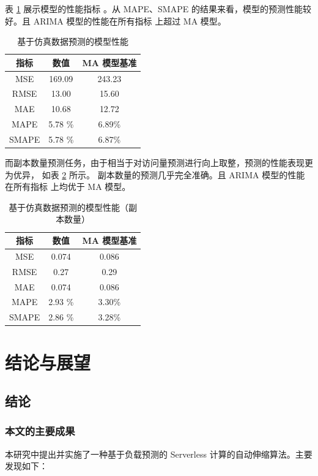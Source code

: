 \documentclass[a4paper,AutoFakeBold,oneside,12pt]{book}
\begin{document}
  表 \ref*{table:sim_regression_metrics} 展示模型的性能指标
  。从 MAPE、SMAPE 的结果来看，模型的预测性能较好。且 ARIMA 模型的性能在所有指标
  上超过 MA 模型。
  
  \begin{table}[tbp]
  \centering
  \caption{基于仿真数据预测的模型性能}
  \label{table:sim_regression_metrics}
  \begin{tabular}{c|c|c}
  \hline
  \textbf{指标} & \textbf{数值} & \textbf{MA 模型基准}\\
  \hline
  MSE & 169.09 & 243.23\\
  RMSE & 13.00 &  15.60\\
  MAE & 10.68 & 12.72\\
  MAPE & 5.78 \% &  6.89\%\\
  SMAPE & 5.78 \% & 6.87\%\\
  \hline
  \end{tabular}
  \end{table}

  而副本数量预测任务，由于相当于对访问量预测进行向上取整，预测的性能表现更为优异，
  如表 \ref{table:sim_classification_metrics} 所示。
  副本数量的预测几乎完全准确。且 ARIMA 模型的性能在所有指标
  上均优于 MA 模型。

\begin{table}[tbp]
	\centering
	\caption{基于仿真数据预测的模型性能（副本数量）}
	\label{table:sim_classification_metrics}
	\begin{tabular}{c|c|c}
	\hline
	\textbf{指标} & \textbf{数值} & \textbf{MA 模型基准}\\
	\hline
	MSE & 0.074 & 0.086\\
	RMSE & 0.27 & 0.29\\
	MAE & 0.074 & 0.086\\
	MAPE & 2.93 \% & 3.30\%\\
	SMAPE & 2.86 \% & 3.28\%\\
	\hline
	\end{tabular}
	\end{table}

\chapter{结论与展望}
\section{结论}
\subsection{本文的主要成果}
本研究中提出并实施了一种基于负载预测的 Serverless 计算的自动伸缩算法。主要发现如下：
\end{document}
